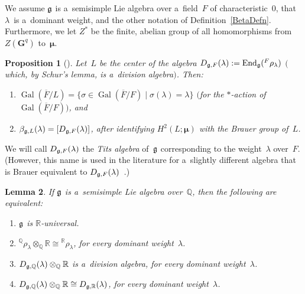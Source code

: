 \documentclass[10pt,a4paper]{amsart}
\DeclareMathOperator{\Gal}{Gal}
\numberwithin{equation}{section}
\newtheorem{prop}{Proposition}[section]
\newtheorem{lem}[prop]{Lemma}
{\theoremstyle{definition}
\newtheorem{defn}[prop]{Definition}
\newtheorem{notation}[prop]{Notation}
\newtheorem{rem}[prop]{Remark}
\newtheorem{ques}[prop]{Question}
\newtheorem{eg}[prop]{Example}
\newtheorem{erratum}[prop]{Erratum}}
\newcommand{\Lie}[1]{\mathfrak{\lowercase{#1}}}
\begin{document}
\begin{notation}
We assume $\Lie G$ is a~semisimple Lie algebra over a~f\/ield~$F$ of characteristic~$0$, that~$\lambda$~is a~dominant
weight, and the other notation of Def\/inition~\ref{BetaDefn}.
Furthermore, we let $Z^*$ be the f\/inite, abelian group of all homomorphisms from $Z(\mathbf{G}^q)$ to~$\boldsymbol\mu$.
\end{notation}

\begin{prop}[]\label{Beta=D}
Let~$L$ be the center of the algebra $D_{\Lie G, F}(\lambda):= \mathrm{End}_{\Lie G}({}^F \rho_\lambda)$ $($which,
by Schur's lemma, is a~division algebra$)$.
Then:
\renewcommand{\labelenumi}{{\rm (\theenumi)}}
\begin{enumerate}\itemsep=0pt
\item
\label{Beta=D-invt}
$\Gal(\overline{F}/L) = \{ \sigma \in \Gal(\overline{F}/F) \mid \sigma(\lambda) = \lambda \}$ $($for the $*$-action
of $\Gal(\overline{F}/F))$, and
\item $\beta_{\Lie G, L}(\lambda) = [D_{\Lie G, F}(\lambda)]$, after identifying $H^2(L; \boldsymbol\mu)$ with the
Brauer group of~$L$.
\end{enumerate}
\end{prop}

\begin{defn}
We will call $D_{\Lie G, F}(\lambda)$ the \emph{Tits algebra} of~$\Lie G$ corresponding to the weight~$\lambda$
over~$F$.
(However, this name is used in the literature for a~slightly dif\/ferent algebra that is Brauer equivalent to $D_{\Lie G,
F}(\lambda)$~\cite[\S~27A, p.~377]{KnusEtAl-BookOfInvols}.)
\end{defn}


\begin{lem}
\label{RunivIff}
If $\Lie G$ is a~semisimple Lie algebra over~$\mathbb{Q}$, then the following are equivalent:
\renewcommand{\labelenumi}{{\rm \theenumi.}}
\begin{enumerate}\itemsep=0pt
\item
\label{RunivIff-univ}
$\Lie G$ is $\mathbb{R}$-universal.
\item
\label{RunivIff-irred}
${}^\mathbb{Q} \rho_\lambda \otimes_\mathbb{Q} \mathbb{R} \cong {}^\mathbb{R} \rho_\lambda$, for every dominant
weight~$\lambda$.
\item
\label{RunivIff-DivAlg}
$D_{\Lie G, \mathbb{Q}}(\lambda) \otimes_\mathbb{Q} \mathbb{R}$ is a~division algebra, for every dominant
weight~$\lambda$.
\item
\label{RunivIff-D}
$D_{\Lie G, \mathbb{Q}}(\lambda) \otimes_\mathbb{Q} \mathbb{R} \cong D_{\Lie G, \mathbb{R}}(\lambda)$, for every
dominant weight~$\lambda$.
\end{enumerate}
\end{lem}
\end{document}
